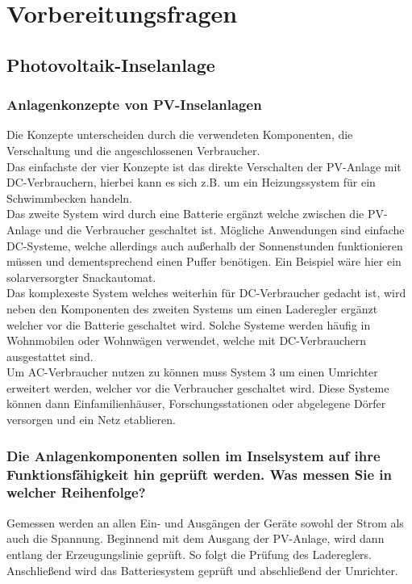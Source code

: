 \section{Vorbereitungsfragen}
\subsection{Photovoltaik-Inselanlage}
\subsubsection{Anlagenkonzepte von PV-Inselanlagen }
Die Konzepte unterscheiden durch die verwendeten
Komponenten, die Verschaltung und die angeschlossenen Verbraucher.\\
Das einfachste der vier Konzepte ist das direkte Verschalten der PV-Anlage mit
DC-Verbrauchern, hierbei kann es sich z.B. um ein Heizungssystem für ein Schwimmbecken handeln.\\
Das zweite System wird durch eine Batterie ergänzt welche zwischen die PV-Anlage und die Verbraucher geschaltet ist.
Mögliche Anwendungen sind einfache DC-Systeme, welche allerdings auch außerhalb der Sonnenstunden
funktionieren müssen und dementsprechend einen Puffer benötigen. Ein Beispiel wäre hier ein solarversorgter Snackautomat.\\
Das komplexeste System welches weiterhin für DC-Verbraucher gedacht ist, wird neben den Komponenten des zweiten Systems
um einen Laderegler ergänzt welcher vor die Batterie geschaltet wird. Solche Systeme werden häufig in
Wohnmobilen oder Wohnwägen verwendet, welche mit DC-Verbrauchern ausgestattet sind.\\
Um AC-Verbraucher nutzen zu können muss System 3 um einen Umrichter erweitert werden, welcher vor die Verbraucher geschaltet wird. Diese Systeme können dann Einfamilienhäuser, Forschungsstationen oder abgelegene Dörfer versorgen und ein Netz etablieren.\\ 
\subsubsection{Die Anlagenkomponenten sollen im Inselsystem auf ihre Funktionsfähigkeit hin geprüft werden. Was messen Sie in welcher Reihenfolge?}
Gemessen werden an allen Ein- und Ausgängen der Geräte sowohl der Strom als auch die Spannung.
Beginnend mit dem Ausgang der PV-Anlage, wird dann entlang der Erzeugungslinie geprüft.
So folgt die Prüfung des Ladereglers. Anschließend wird das Batteriesystem geprüft und abschließend der 
Umrichter.\\


